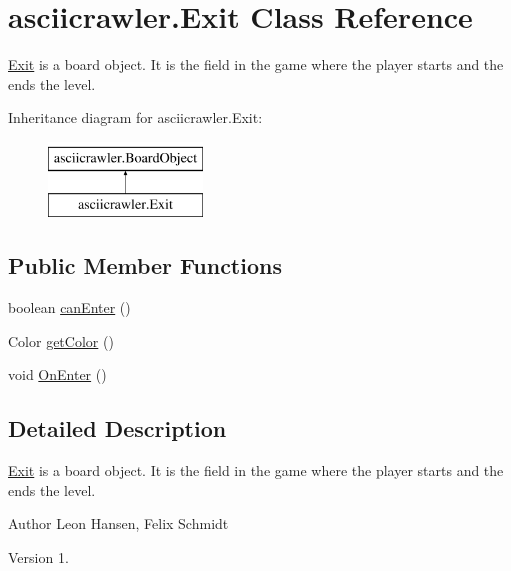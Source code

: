 \hypertarget{classasciicrawler_1_1Exit}{}\section{asciicrawler.\+Exit Class Reference}
\label{classasciicrawler_1_1Exit}


\hyperlink{classasciicrawler_1_1Exit}{Exit} is a board object. It is the field in the game where the player starts and the ends the level.  


Inheritance diagram for asciicrawler.\+Exit\+:\begin{figure}[H]
\begin{center}
\leavevmode
\includegraphics[height=2.000000cm]{classasciicrawler_1_1Exit}
\end{center}
\end{figure}
\subsection*{Public Member Functions}
\begin{DoxyCompactItemize}
\item 
boolean \hyperlink{classasciicrawler_1_1Exit_a38b93acb30670f4f4ba1c3059e0bbfa0}{can\+Enter} ()
\item 
Color \hyperlink{classasciicrawler_1_1Exit_a846df814b72bfab477c524427570d0cd}{get\+Color} ()
\item 
void \hyperlink{classasciicrawler_1_1Exit_adaf13dd0b5f3bb6cf25230da9dc166bc}{On\+Enter} ()
\end{DoxyCompactItemize}


\subsection{Detailed Description}
\hyperlink{classasciicrawler_1_1Exit}{Exit} is a board object. It is the field in the game where the player starts and the ends the level. 

\begin{DoxyAuthor}{Author}
Leon Hansen, Felix Schmidt 
\end{DoxyAuthor}
\begin{DoxyVersion}{Version}
1. 
\end{DoxyVersion}


